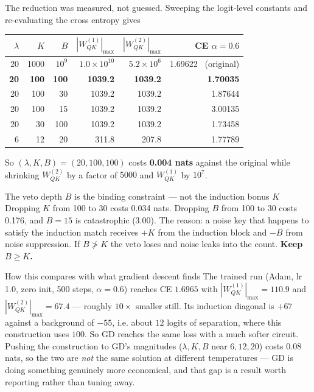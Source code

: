 \documentclass[11pt]{article}
\newcommand{\Wqk}{W_{QK}}
\begin{document}
The reduction was measured, not guessed. Sweeping the logit-level constants and re-evaluating the
cross entropy gives

\begin{center}\small
\begin{tabular}{@{}rrrrrr@{}}
\toprule
$\lambda$ & $K$ & $B$ & $|\Wqk^{(1)}|_{\max}$ & $|\Wqk^{(2)}|_{\max}$ & CE $\alpha{=}0.6$ \\
\midrule
20 & 1000 & $10^9$ & $1.0\times10^{10}$ & $5.2\times10^{6}$ & 1.69622 \ \small(original) \\
\textbf{20} & \textbf{100} & \textbf{100} & \textbf{1039.2} & \textbf{1039.2} & \textbf{1.70035} \\
20 & 100 & 30  & 1039.2 & 1039.2 & 1.87644 \\
20 & 100 & 15  & 1039.2 & 1039.2 & 3.00135 \\
20 & 30  & 100 & 1039.2 & 1039.2 & 1.73458 \\
6  & 12  & 20  & \ \ 311.8 & \ \ 207.8 & 1.77789 \\
\bottomrule
\end{tabular}
\end{center}

So $(\lambda,K,B)=(20,100,100)$ costs \textbf{0.004 nats} against the original while shrinking
$\Wqk^{(2)}$ by a factor of $5000$ and $\Wqk^{(1)}$ by $10^{7}$.

\begin{warningbox}{The veto depth $B$ is the binding constraint --- not the induction bonus $K$}
Dropping $K$ from 100 to 30 costs 0.034 nats. Dropping $B$ from 100 to 30 costs 0.176, and $B=15$
is catastrophic (3.00). The reason: a noise key that happens to satisfy the induction match
receives $+K$ from the induction block and $-B$ from noise suppression. If $B \not> K$ the veto
loses and noise leaks into the count. \textbf{Keep $B \ge K$.}
\end{warningbox}

\begin{notebox}{How this compares with what gradient descent finds}
The trained run (Adam, lr 1.0, zero init, 500 steps, $\alpha=0.6$) reaches CE $1.6965$ with
$|\Wqk^{(1)}|_{\max}=110.9$ and $|\Wqk^{(2)}|_{\max}=67.4$ --- roughly $10\times$ smaller still.
Its induction diagonal is $+67$ against a background of $-55$, i.e. about $12$ logits of
separation, where this construction uses $100$. So GD reaches the same loss with a much softer
circuit. Pushing the construction to GD's magnitudes ($\lambda,K,B$ near $6,12,20$) costs
$0.08$ nats, so the two are \emph{not} the same solution at different temperatures --- GD is doing
something genuinely more economical, and that gap is a result worth reporting rather than tuning
away.
\end{notebox}
\end{document}
